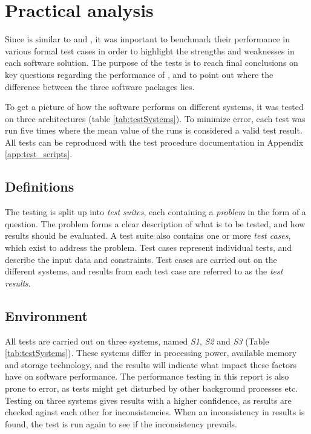 \section{Practical analysis}
\label{sec:practical_analysis}

Since \snowman{} is similar to \bhtb{} and \snortmanager{}, it was
important to benchmark their performance in various formal test cases in order to
highlight the strengths and weaknesses in each software solution. The
purpose of the tests is to reach final conclusions on key questions regarding
the performance of \snowman{}, and to point out where the difference between the
three software packages lies.

To get a picture of how the software performs on different systems, it was
tested on three architectures (table \ref{tab:testSystems}). To minimize error, each test
was run five times where the mean value of the runs is considered a valid test
result. All tests can be reproduced with the test procedure documentation in
Appendix \ref{app:test_scripts}.

\subsection{Definitions}

The testing is split up into \textit{test suites}, each containing a
\textit{problem} in the form of a question. The problem forms a clear
description of what is to be tested, and how results should be evaluated.
A test suite also contains one or more \textit{test cases}, which exist to
address the problem. Test cases represent individual tests, and describe the input data
and constraints. Test cases are carried out on the different systems, and
results from each test case are referred to as the \textit{test results}.

\subsection{Environment}
All tests are carried out on three systems, named \textit{S1}, \textit{S2} and
\textit{S3} (Table \ref{tab:testSystems}). These systems differ in processing
power, available memory and storage technology, and the results will indicate
what impact these factors have on software performance. The performance
testing in this report is also prone to error, as tests might get disturbed by
other background processes etc. Testing on three systems gives results with a
higher confidence, as results are checked aginst each other for 
inconsistencies. When an inconsistency in results is found, the test is run
again to see if the inconsistency prevails.

